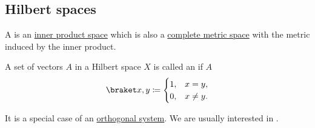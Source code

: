 \subsection{Hilbert spaces}\label{subsec:hilbert_spaces}

\begin{definition}\label{def:hilbert_space}
  A  is an \hyperref[def:inner_product_space]{inner product space} which is also a \hyperref[def:complete_metric_space]{complete metric space} with the metric induced by the inner product.
\end{definition}

\begin{definition}\label{def:orthonormal_system}
  A set of vectors \( A \) in a Hilbert space \( X \) is called an  if \( A \)
  \begin{equation*}
    \inner x y \coloneqq \begin{cases}
      1, & x = y,    \\
      0, & x \neq y.
    \end{cases}
  \end{equation*}

  It is a special case of an \hyperref[def:orthogonality]{orthogonal system}. We are usually interested in .
\end{definition}
